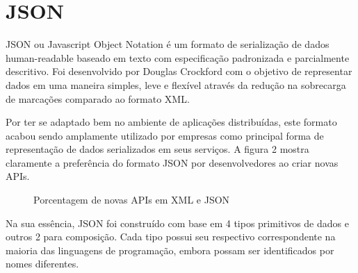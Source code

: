 \section{JSON}

JSON ou Javascript Object Notation é um formato de serialização de dados human-readable baseado em texto com especificação padronizada e parcialmente descritivo. Foi desenvolvido por Douglas Crockford com o objetivo de representar dados em uma maneira simples, leve e flexível através da redução na sobrecarga de marcações comparado ao formato XML.

Por ter se adaptado bem no ambiente de aplicações distribuídas, este formato acabou sendo amplamente utilizado por empresas como principal forma de representação de dados serializados em seus serviços. A figura 2 mostra claramente a preferência do formato JSON por desenvolvedores ao criar novas APIs. \cite{Duvander2013}

\begin{figure}[H]
  \centering
  \caption{Porcentagem de novas APIs em XML e JSON}
\end{figure}

Na sua essência, JSON foi construído com base em 4 tipos primitivos de dados e outros 2 para composição. Cada tipo possui seu respectivo correspondente na maioria das linguagens de programação, embora possam ser identificados por nomes diferentes. \cite{Droettboom2015}

